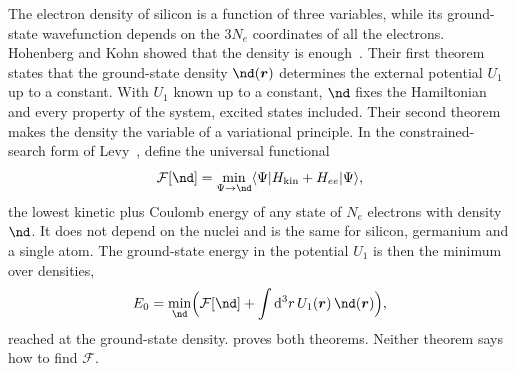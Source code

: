 The electron density of silicon is a function of three variables, while its ground-state wavefunction depends on the $3N_e$ coordinates of all the electrons. Hohenberg and Kohn showed that the density is enough~\cite{hohenberg1964inhomogeneous}. Their first theorem states that the ground-state density $\nd(\vect{r})$ determines the external potential $U_1$ up to a constant. With $U_1$ known up to a constant, $\nd$ fixes the Hamiltonian and every property of the system, excited states included. Their second theorem makes the density the variable of a variational principle. In the constrained-search form of Levy~\cite{levy1979universal}, define the universal functional
\begin{equation*}
  \mathcal{F}[\nd] = \min_{\Psi\to\nd}\langle\Psi|H_{\mathrm{kin}} + H_{ee}|\Psi\rangle ,
\end{equation*}
the lowest kinetic plus Coulomb energy of any state of $N_e$ electrons with density $\nd$. It does not depend on the nuclei and is the same for silicon, germanium and a single atom. The ground-state energy in the potential $U_1$ is then the minimum over densities,
\begin{equation}
  E_0 = \min_{\nd}\Bigl(\mathcal{F}[\nd] + \int\dd^3r\,U_1(\vect{r})\,\nd(\vect{r})\Bigr),
  \label{eq:3.4-HK}
\end{equation}
reached at the ground-state density.  proves both theorems. Neither theorem says how to find $\mathcal{F}$.

